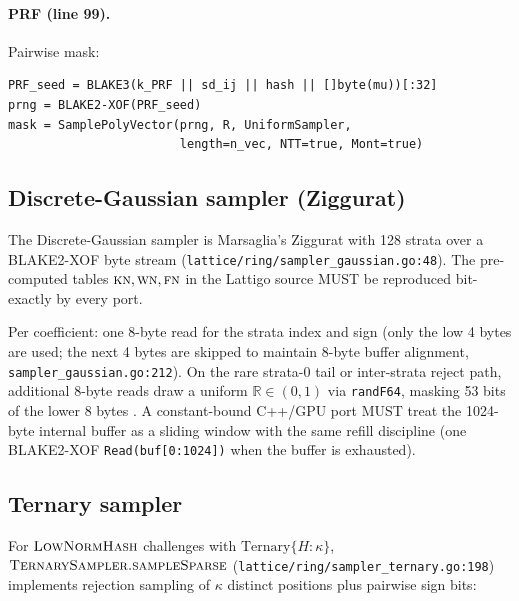 \paragraph{\textsc{PRF} (line 99).} Pairwise mask:

\begin{lstlisting}
PRF_seed = BLAKE3(k_PRF || sd_ij || hash || []byte(mu))[:32]
prng = BLAKE2-XOF(PRF_seed)
mask = SamplePolyVector(prng, R, UniformSampler,
                        length=n_vec, NTT=true, Mont=true)
\end{lstlisting}

\subsection{Discrete-Gaussian sampler (Ziggurat)}

The Discrete-Gaussian sampler is Marsaglia's Ziggurat \cite{ziggurat,lattigov7} with 128 strata over a BLAKE2-XOF byte stream (\texttt{lattice/ring/sampler\_gaussian.go:48}). The pre-computed tables $\textsc{kn}, \textsc{wn}, \textsc{fn}$ in the Lattigo source MUST be reproduced bit-exactly by every port.

Per coefficient: one 8-byte read for the strata index and sign (only the low 4 bytes are used; the next 4 bytes are skipped to maintain 8-byte buffer alignment, \texttt{sampler\_gaussian.go:212}). On the rare strata-0 tail or inter-strata reject path, additional 8-byte reads draw a uniform $\mathbb{R} \in (0, 1)$ via \texttt{randF64}, masking 53 bits of the lower 8 bytes \cite{lattigov7}. A constant-bound C++/GPU port MUST treat the 1024-byte internal buffer as a sliding window with the same refill discipline (one BLAKE2-XOF \texttt{Read(buf[0:1024])} when the buffer is exhausted).

\subsection{Ternary sampler}

For $\textsc{LowNormHash}$ challenges with $\mathrm{Ternary}\{H: \kappa\}$, $\textsc{TernarySampler.sampleSparse}$ (\texttt{lattice/ring/sampler\_ternary.go:198}) implements rejection sampling of $\kappa$ distinct positions plus pairwise sign bits:

